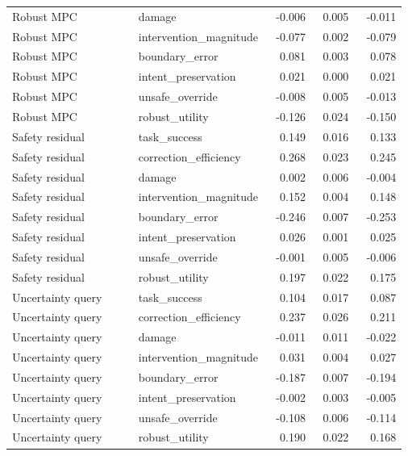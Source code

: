 \documentclass{article}
\begin{document}
\begin{center}
\begin{longtable}{p{0.32\linewidth}p{0.25\linewidth}rrr}
Robust MPC & damage & -0.006 & 0.005 & -0.011\\
Robust MPC & intervention\_magnitude & -0.077 & 0.002 & -0.079\\
Robust MPC & boundary\_error & 0.081 & 0.003 & 0.078\\
Robust MPC & intent\_preservation & 0.021 & 0.000 & 0.021\\
Robust MPC & unsafe\_override & -0.008 & 0.005 & -0.013\\
Robust MPC & robust\_utility & -0.126 & 0.024 & -0.150\\
Safety residual & task\_success & 0.149 & 0.016 & 0.133\\
Safety residual & correction\_efficiency & 0.268 & 0.023 & 0.245\\
Safety residual & damage & 0.002 & 0.006 & -0.004\\
Safety residual & intervention\_magnitude & 0.152 & 0.004 & 0.148\\
Safety residual & boundary\_error & -0.246 & 0.007 & -0.253\\
Safety residual & intent\_preservation & 0.026 & 0.001 & 0.025\\
Safety residual & unsafe\_override & -0.001 & 0.005 & -0.006\\
Safety residual & robust\_utility & 0.197 & 0.022 & 0.175\\
Uncertainty query & task\_success & 0.104 & 0.017 & 0.087\\
Uncertainty query & correction\_efficiency & 0.237 & 0.026 & 0.211\\
Uncertainty query & damage & -0.011 & 0.011 & -0.022\\
Uncertainty query & intervention\_magnitude & 0.031 & 0.004 & 0.027\\
Uncertainty query & boundary\_error & -0.187 & 0.007 & -0.194\\
Uncertainty query & intent\_preservation & -0.002 & 0.003 & -0.005\\
Uncertainty query & unsafe\_override & -0.108 & 0.006 & -0.114\\
Uncertainty query & robust\_utility & 0.190 & 0.022 & 0.168\\
\bottomrule
\end{longtable}
\normalsize
\end{center}
\end{document}
